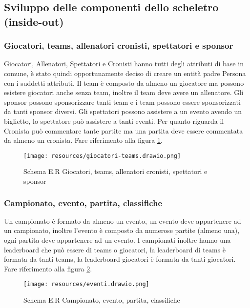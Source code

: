 \documentclass{article}
\begin{document}
\subsection{Sviluppo delle componenti dello scheletro (inside-out)}

\subsubsection{Giocatori, teams, allenatori cronisti, spettatori e sponsor}

Giocatori, Allenatori, Spettatori e Cronisti hanno tutti degli attributi di base in comune, è stato quindi opportunamente deciso di creare un entità padre Persona con i suddetti attributi. Il team è composto da almeno un giocatore ma possono esistere giocatori anche senza team, inoltre il team deve avere un allenatore. Gli sponsor possono sponsorizzare tanti team e i team possono essere sponsorizzati da tanti sponsor diversi. Gli spettatori possono assistere a un evento avendo un biglietto, lo spettatore può assistere a tanti eventi. Per quanto riguarda il Cronista può commentare tante partite ma una partita deve essere commentata da almeno un cronista. Fare riferimento alla figura \ref{fig_secondo_scheletro_ER}.

\begin{figure}
    \centering
    \texttt{[image: resources/giocatori-teams.drawio.png]}
    \caption{Schema E.R Giocatori, teams, allenatori cronisti, spettatori e sponsor}
    \label{fig_secondo_scheletro_ER}
\end{figure}

\subsubsection{Campionato, evento, partita, classifiche}

Un campionato è formato da almeno un evento, un evento deve appartenere ad un campionato, inoltre l'evento è composto da numerose partite (almeno una), ogni partita deve appartenere ad un evento. I campionati inoltre hanno una leaderboard che può essere di teams o giocatori, la leaderboard di teams è formata da tanti teams, la leaderboard giocatori è formata da tanti giocatori. Fare riferimento alla figura \ref{fig_terzo_scheletro_ER}.

\begin{figure}
    \centering
    \texttt{[image: resources/eventi.drawio.png]}
    \caption{Schema E.R Campionato, evento, partita, classifiche}
    \label{fig_terzo_scheletro_ER}
\end{figure}
\end{document}
